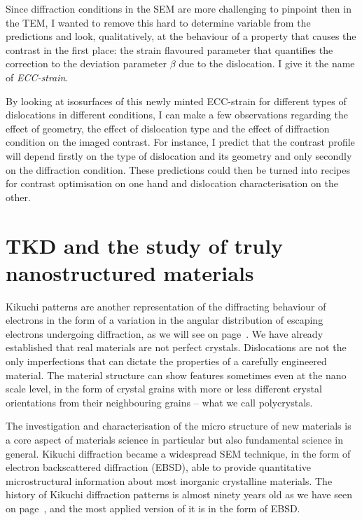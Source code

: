 Since diffraction conditions in the SEM are more challenging to pinpoint then in the TEM, I wanted to remove this hard to determine variable from the predictions and look, qualitatively, at the behaviour of a property that causes the contrast in the first place: the strain flavoured parameter that quantifies the correction to the deviation parameter $\beta$ due to the dislocation. I give it the name of \textit{ECC-strain}. 

By looking at isosurfaces of this newly minted ECC-strain for different types of dislocations in different conditions, I can make a few observations regarding the effect of geometry, the effect of dislocation type and the effect of diffraction condition on the imaged contrast. For instance, I predict that the contrast profile will depend firstly on the type of dislocation and its geometry and only secondly on the diffraction condition. These predictions could then be turned into recipes for contrast optimisation on one hand and dislocation characterisation on the other.



\section{TKD and the study of truly nanostructured materials}





Kikuchi patterns are another representation of the diffracting behaviour of electrons in the form of a variation in the angular distribution of escaping electrons undergoing diffraction, as we will see on page~\pageref{sec:Kikuchi}. We have already established that real materials are not perfect crystals. Dislocations are not the only imperfections that can dictate the properties of a carefully engineered material. The material structure can show features sometimes even at the nano scale level, in the form of crystal grains with more or less different crystal orientations from their neighbouring grains -- what we call polycrystals. 

The investigation and characterisation of the micro structure of new materials is a core aspect of materials science in particular but also fundamental science in general. Kikuchi diffraction became a widespread SEM technique, in the form of electron backscattered diffraction (EBSD), able to provide quantitative microstructural information about most inorganic crystalline materials. The history of Kikuchi diffraction patterns is almost ninety years old as we have seen on page~\pageref{table:historyDiff}, and the most applied version of it is in the form of EBSD.


